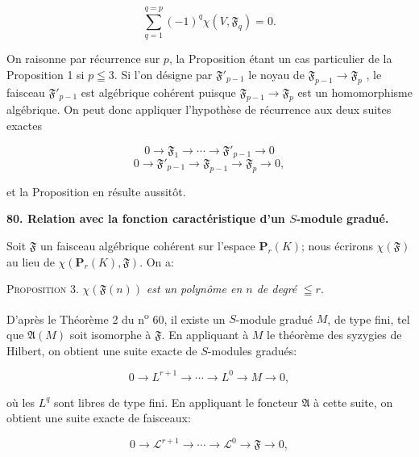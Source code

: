 \begin{equation*}
\sum_{q=1}^{q=p} (-1)^q \chi(V, \mathfrak{F}_q) = 0.
\end{equation*}

On raisonne par récurrence sur $p$, la Proposition étant un cas particulier de la Proposition 1 si $p \leqq 3$. Si l'on désigne par $\mathfrak{F}'_{p-1}$ le noyau de $\mathfrak{F}_{p-1} \rightarrow \mathfrak{F}_p$ , le faisceau $\mathfrak{F}'_{p-1}$ est algébrique cohérent puisque $\mathfrak{F}_{p-1} \rightarrow \mathfrak{F}_p$ est un homomorphisme algébrique. On peut donc appliquer l'hypothèse de récurrence aux deux suites exactes

\begin{equation*}
0 \rightarrow \mathfrak{F}_1 \rightarrow \cdots \rightarrow \mathfrak{F}'_{p-1} \rightarrow 0
\end{equation*}
\begin{equation*}
0 \rightarrow \mathfrak{F}'_{p-1} \rightarrow \mathfrak{F}_{p-1} \rightarrow \mathfrak{F}_p \rightarrow 0,
\end{equation*}

et la Proposition en résulte aussitôt.

\textbf{80. Relation avec la fonction caractéristique d'un $S$-module gradué.}

Soit $\mathfrak{F}$ un faisceau algébrique cohérent sur l'espace $\mathbf{P}_r(K)$; nous écrirons $\chi(\mathfrak{F})$ au lieu de $\chi(\mathbf{P}_r(K), \mathfrak{F})$. On a:

\textsc{Proposition} 3. $\chi(\mathfrak{F}(n))$ \textit{est un polynôme en $n$ de degré} $\leqq r$.

D'après le Théorème 2 du n\textsuperscript{o} 60, il existe un $S$-module gradué $M$, de type fini, tel que $\mathfrak{A}(M)$ soit isomorphe à $\mathfrak{F}$. En appliquant à $M$ le théorème des syzygies de Hilbert, on obtient une suite exacte de $S$-modules gradués:

\begin{equation*}
0 \rightarrow L^{r+1} \rightarrow \cdots \rightarrow L^0 \rightarrow M \rightarrow 0,
\end{equation*}

où les $L^q$ sont libres de type fini. En appliquant le foncteur $\mathfrak{A}$ à cette suite, on obtient une suite exacte de faisceaux:

\begin{equation*}
0 \rightarrow \mathcal{L}^{r+1} \rightarrow \cdots \rightarrow \mathcal{L}^0 \rightarrow \mathfrak{F} \rightarrow 0,
\end{equation*}

